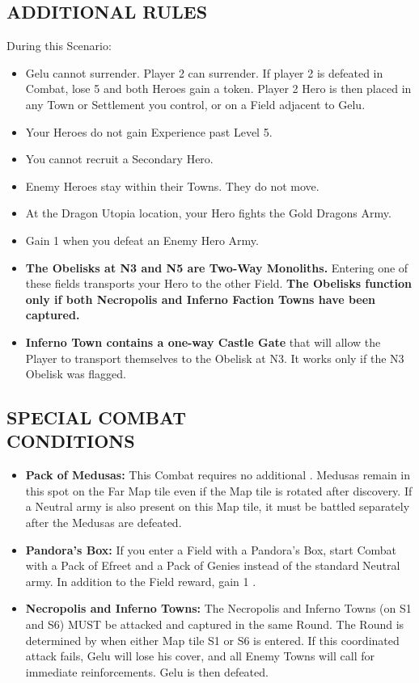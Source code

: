 \begin{multicols*}{2}
\subsection*{\MakeUppercase{Additional Rules}}

During this Scenario:

\begin{itemize}
    \item Gelu cannot surrender.
      Player 2 can surrender.
      If player 2 is defeated in Combat, lose 5  and both Heroes gain a  token.
      Player 2 Hero is then placed in any Town or Settlement you control, or on a Field adjacent to Gelu.
    \item Your Heroes do not gain Experience past Level 5.
    \item You cannot recruit a Secondary Hero.
    \item Enemy Heroes stay within their Towns. They do not move.
    \item At the Dragon Utopia location, your Hero fights the Gold Dragons Army.
    \item Gain 1  when you defeat an Enemy Hero Army.
    \item \textbf{The Obelisks at N3 and N5 are Two-Way Monoliths.}
      Entering one of these fields transports your Hero to the other Field. \textbf{The Obelisks function only if both Necropolis and Inferno Faction Towns have been captured.}
    \item \textbf{Inferno Town contains a one-way Castle Gate} that will allow the Player to transport themselves to the Obelisk at N3. It works only if the N3 Obelisk was flagged.
\end{itemize}

\subsection*{\MakeUppercase{Special Combat\\Conditions}}

\begin{itemize}
  \item \textbf{Pack of Medusas:} This Combat requires no additional .
    Medusas remain in this spot on the Far Map tile even if the Map tile is rotated after discovery.
    If a Neutral army is also present on this Map tile, it must be battled separately after the Medusas are defeated.
  \item \textbf{Pandora's Box:} If you enter a Field with a Pandora's Box, start Combat with a Pack of Efreet and a Pack of Genies instead of the standard Neutral army.
    In addition to the Field reward, gain 1 .
  \item \textbf{Necropolis and Inferno Towns:} The Necropolis and Inferno Towns (on S1 and S6) MUST be attacked and captured in the same Round.
    The Round is determined by when either Map tile S1 or S6 is entered.
    If this coordinated attack fails, Gelu will lose his cover, and all Enemy Towns will call for immediate reinforcements.
    Gelu is then defeated.
\end{itemize}


\end{multicols*}

